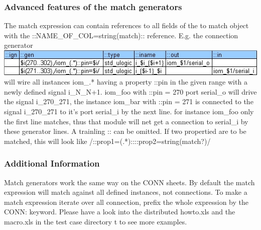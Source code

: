 \documentclass[a4paper,12pt]{article}
\begin{document}
\subsubsection{Advanced features of the match generators}
The match expression can contain references to all fields of the to match object with the\newline
::NAME\_OF\_COL=string(match):: reference.\newline
\newline
E.g. the connection generator\newline
\includegraphics[scale=0.80]{images/gen_2.jpg}\\
will wire all instances iom\_.* having a property ::pin in the given range with a newly defined signal i\_N\_{N+1}. iom\_foo with ::pin = 270 port serial\_o will drive the signal i\_270\_271, the instance iom\_bar with ::pin = 271 is connected to the signal i\_270\_271 to it's port serial\_i by the next line. for instance iom\_foo only the first line matches, thus that module will net get a connection to serial\_i by these generator lines.\newline
\newline
A trainling :: can be omitted. If two propertied are to be matched, this will look like\newline
\hspace*{10mm}/::prop1=(.*)::::prop2=string(match?)/

\subsubsection{Additional Information}
Match generators work the same way on the CONN sheets. By default the match expression will match against all defined instances, not connections.\newline
To make a match expression iterate over all connection, prefix the whole expression by the CONN: keyword.\newline
\newline
Please have a look into the distributed howto.xls and the macro.xls in the test case directory t to see more examples.
\end{document}
